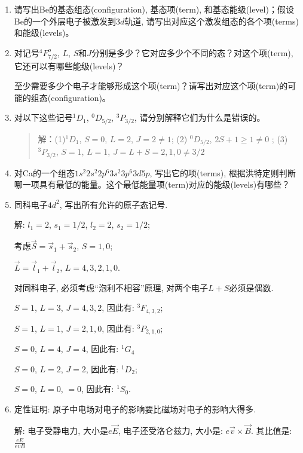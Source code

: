 \begin{enumerate}
  \item 请写出Be的基态组态(configuration), 基态项(term),
和基态能级(level)；假设Be的一个外层电子被激发到$3d$轨道,
请写出对应这个激发组态的各个项(terms)和能级(levels)。


  \item 对记号${}^4F^o_{7/2}$, $L$,
$S$和$J$分别是多少？它对应多少个不同的态？对这个项(term),
它还可以有哪些能级(levels)？

至少需要多少个电子才能够形成这个项(term)？请写出对应这个项(term)的可能的组态(configuration)。


  \item 对以下这些记号${}^1D_1$, ${}^0D_{5/2}$, ${}^3P_{3/2}$,
请分别解释它们为什么是错误的。

\begin{quote}
解：(1)${}^1D_1$, $S=0$, $L=2$, $J=2 \ne 1$; (2) ${}^0D_{5/2}$,
$2S+1 \ge 1 \ne 0$ ; (3)${}^3P_{3/2}$, $S=1$, $L=1$, $J=L+S=2,1,0
\ne 3/2$
\end{quote}


  \item 对Ca的一个组态$1s^2 2s^2 2p^6 3s^2 3p^6 3d 5p$,
  写出它的项(terms),
  根据洪特定则判断哪一项具有最低的能量。这个最低能量项(term)对应的能级(levels)有哪些？


\item 同科电子$4d^2$, 写出所有允许的原子态记号.

解: $l_1 =2$, $s_1 =1/2$, $l_2 =2$, $s_2=1/2$;

考虑$\vec S = \vec s_1 + \vec s_2$, $S = 1, 0$;

$\vec L = \vec l_1 + \vec l_2$, $L = 4, 3, 2, 1, 0$.

对同科电子, 必须考虑``泡利不相容''原理, 对两个电子$L+S$必须是偶数.

$S=1$, $L=3$, $J=4,3,2$, 因此有: ${}^3 F_{4,3,2}$;

$S=1$, $L=1$, $J = 2,1,0$, 因此有: ${}^3 P_{2,1,0}$;

$S=0$, $L=4$, $J=4$, 因此有: ${}^1 G_4$

$S=0$, $L=2$, $J=2$, 因此有: ${}^1 D_2$;

$S=0$, $L=0$, $=0$, 因此有: ${}^1 S_0$.

  \item 定性证明: 原子中电场对电子的影响要比磁场对电子的影响大得多.

  解: 电子受静电力, 大小是$e \vec E$, 电子还受洛仑兹力, 大小是: $e \vec v \times \vec B
  $. 其比值是: $\frac{e E}{ e v B}$



\end{enumerate}

